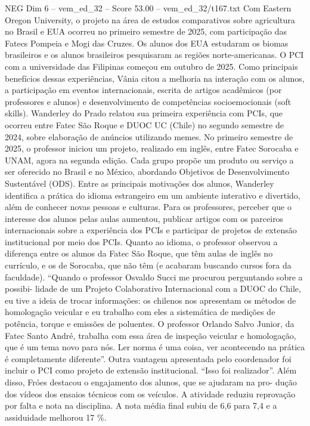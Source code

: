 \begin{textsample}{NEG Dim 6 – vem\_ed\_32 – Score 53.00 – vem\_ed\_32/t167.txt}
Com Eastern Oregon University, o projeto na área de estudos comparativos sobre agricultura no Brasil e EUA ocorreu no primeiro semestre de 2025, com participação das Fatecs Pompeia e Mogi das Cruzes.
Os alunos dos EUA estudaram os biomas brasileiros e os alunos brasileiros pesquisaram as regiões norte-americanas.
O PCI com a universidade das Filipinas começou em outubro de 2025.
Como principais benefícios dessas experiências, Vânia citou a melhoria na interação com os alunos, a participação em eventos internacionais, escrita de artigos acadêmicos (por professores e alunos) e desenvolvimento de competências socioemocionais (soft skills).
Wanderley do Prado relatou sua primeira experiência com PCIs, que ocorreu entre Fatec São Roque e DUOC UC (Chile) no segundo semestre de 2024, sobre elaboração de anúncios utilizando memes.
No primeiro semestre de 2025, o professor iniciou um projeto, realizado em inglês, entre Fatec Sorocaba e UNAM, agora na segunda edição.
Cada grupo propõe um produto ou serviço a ser oferecido no Brasil e no México, abordando Objetivos de Desenvolvimento Sustentável (ODS).
Entre as principais motivações dos alunos, Wanderley identifica a prática do idioma estrangeiro em um ambiente interativo e divertido, além de conhecer novas pessoas e culturas.
Para os professores, perceber que o interesse dos alunos pelas aulas aumentou, publicar artigos com os parceiros internacionais sobre a experiência dos PCIs e participar de projetos de extensão institucional por meio dos PCIs.
Quanto ao idioma, o professor observou a diferença entre os alunos da Fatec São Roque, que têm aulas de inglês no currículo, e os de Sorocaba, que não têm (e acabaram buscando cursos fora da faculdade). “Quando o professor Osvaldo Succi me procurou perguntando sobre a possibi- lidade de um Projeto Colaborativo Internacional com a DUOC do Chile, eu tive a ideia de trocar informações: os chilenos nos apresentam os métodos de homologação veicular e eu trabalho com eles a sistemática de medições de potência, torque e emissões de poluentes.
O professor Orlando Salvo Junior, da Fatec Santo André, trabalha com essa área de inspeção veicular e homologação, que é um tema novo para nós.
Ler norma é uma coisa, ver acontecendo na prática é completamente diferente”.
Outra vantagem apresentada pelo coordenador foi incluir o PCI como projeto de extensão institucional. “Isso foi realizador”.
Além disso, Fróes destacou o engajamento dos alunos, que se ajudaram na pro- dução dos vídeos dos ensaios técnicos com os veículos.
A atividade reduziu reprovação por falta e nota na disciplina.
A nota média final subiu de 6,6 para 7,4 e a assiduidade melhorou 17 \%.

\end{textsample}
